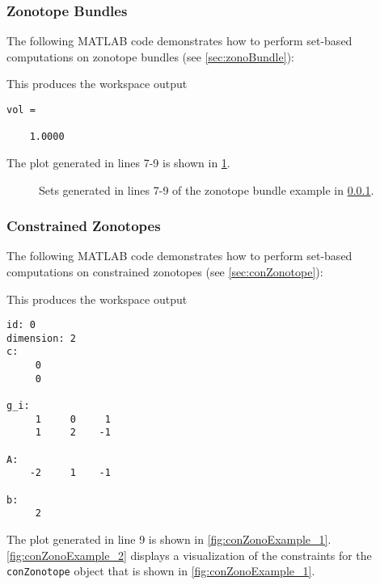 
\newpage
\subsubsection{Zonotope Bundles}	\label{sec:zonoBundleExample}

The following MATLAB code demonstrates how to perform set-based computations on zonotope bundles (see \cref{sec:zonoBundle}):

{\small
}

This produces the workspace output
\begin{verbatim}
vol =

    1.0000
\end{verbatim}

The plot generated in lines 7-9 is shown in \cref{fig:zonoBundleExample}.

\begin{figure}[h!tb]
  \centering
  \caption{Sets generated in lines 7-9 of the zonotope bundle example in \cref{sec:zonoBundleExample}.}
  \label{fig:zonoBundleExample}
\end{figure}







\subsubsection{Constrained Zonotopes}	\label{sec:conZonotopeExample}

The following MATLAB code demonstrates how to perform set-based computations on constrained zonotopes (see \cref{sec:conZonotope}):

{\small
}

This produces the workspace output
\begin{verbatim}
id: 0
dimension: 2
c: 
     0
     0

g_i: 
     1     0     1
     1     2    -1

A: 
    -2     1    -1

b: 
     2
\end{verbatim}

The plot generated in line 9 is shown in \cref{fig:conZonoExample_1}. \cref{fig:conZonoExample_2} displays a visualization of the constraints for the \texttt{conZonotope} object that is shown in \cref{fig:conZonoExample_1}.

